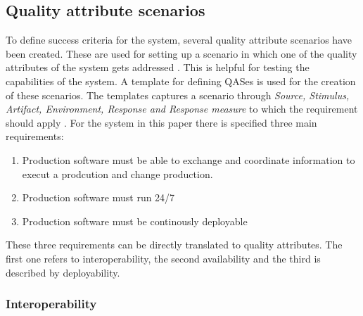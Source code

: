 \subsection{Quality attribute scenarios}
\label{sec:qas}
To define success criteria for the system, several quality attribute scenarios have been created. These are used for setting up a scenario in which one of the quality attributes of the system gets addressed \cite{bass2021software}. This is helpful for testing the capabilities of the system.
A template for defining QASes is used for the creation of these scenarios. The templates captures a scenario through \textit{Source, Stimulus, Artifact, Environment, Response and Response measure} to which the requirement should apply \cite{bass2021software}. \newline
For the system in this paper there is specified three main requirements:
\begin{enumerate}
    \item Production software must be able to exchange and coordinate information to execut a prodcution and change production.
    \item Production software must run 24/7
    \item Production software must be continously deployable
\end{enumerate}
These three requirements can be directly translated to quality attributes. The first one refers to interoperability, the second availability and the third is described by deployability. \newline

\subsubsection{Interoperability}

